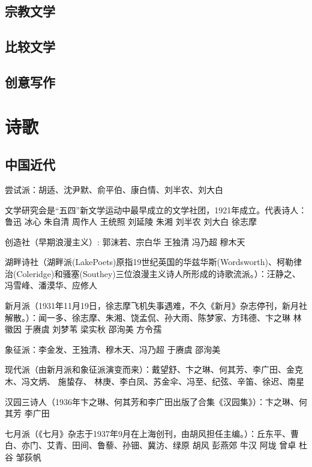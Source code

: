 \documentclass[UTF8]{../../RepresentationUniverse}
\begin{document}
\section{宗教文学}

\section{比较文学}
\section{创意写作}



\chapter{诗歌}


\section{中国近代}


尝试派：胡适、沈尹默、俞平伯、康白情、刘半农、刘大白


文学研究会是“五四”新文学运动中最早成立的文学社团，1921年成立。代表诗人： 鲁迅 冰心 朱自清 周作人 王统照 刘延陵 朱湘 刘半农 刘大白 徐志摩


创造社（早期浪漫主义）: 郭沫若、宗白华 王独清 冯乃超 穆木天


湖畔诗社（湖畔派(LakePoets)原指19世纪英国的华兹华斯(Wordsworth)、柯勒律治(Coleridge)和骚塞(Southey)三位浪漫主义诗人所形成的诗歌流派。）：汪静之、冯雪峰、潘漠华、应修人



新月派（1931年11月19日，徐志摩飞机失事遇难，不久《新月》杂志停刊，新月社解散。）：闻一多、徐志摩、朱湘、饶孟侃、孙大雨、陈梦家、方玮德、卞之琳 林徽因 于赓虞 刘梦苇 梁实秋   邵洵美  方令孺 


象征派：李金发、王独清、穆木天、冯乃超 于赓虞 邵洵美



现代派（由新月派和象征派演变而来）：戴望舒、卞之琳、何其芳、李广田、金克木、冯文炳、 施蛰存、 林庚、李白凤、苏金伞、冯至、纪弦、辛笛、徐迟、南星


汉园三诗人（1936年卞之琳、何其芳和李广田出版了合集《汉园集》）：卞之琳、何其芳 李广田



七月派（《七月》杂志于1937年9月在上海创刊，由胡风担任主编。）：丘东平、曹白、亦门、艾青、田间、鲁藜、孙钿、冀汸、绿原 胡风  彭燕郊 牛汉   阿垅 曾卓 杜谷 邹荻帆
\end{document}
